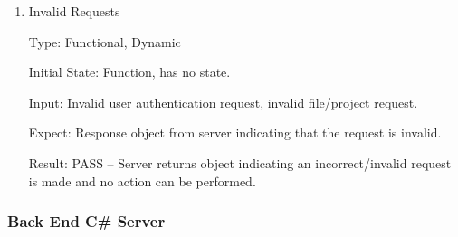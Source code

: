 \documentclass[12pt, titlepage]{article}
\begin{document}
    \begin{enumerate}

      \item{Invalid Requests\\} \label{invalid}

      Type: Functional, Dynamic

      Initial State: Function, has no state.

      Input: Invalid user authentication request, invalid file/project request.

      Expect: Response object from server indicating that the request is invalid.
                
			Result: PASS -- Server returns object indicating an incorrect/invalid
				request is made and no action can be performed.

    \end{enumerate}

  \subsubsection{Back End C\# Server}
\end{document}

